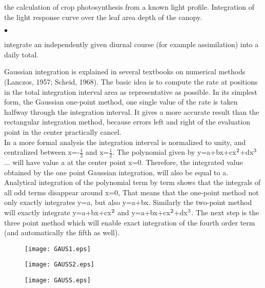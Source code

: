 \documentclass[11pt]{article}
\begin{document}
\begin{indenting}{1.27cm}
the calculation of crop photosynthesis from a known light profile. Integration
of the light response curve over the leaf area depth of the canopy. 
\end{indenting}
$\bullet$ 
\testlastline

\begin{indenting}{1.27cm}
integrate an independently given diurnal course (for example assimilation) into
a daily total.
\end{indenting}

 \bigskip
Gaussian integration is explained in several textbooks on numerical methods (Lanczos, 1957;
Scheid, 1968). The basic idea is to compute the rate at positions in the total integration
interval area as representative as possible. In its simplest form, the Gaussian one-point
method, one single value of the rate is taken halfway through the integration interval. It
gives a more accurate result than the rectangular integration method, because errors left and
right of the evaluation point in the center practically cancel.\\
In a more formal analysis the integration interval is normalized to unity, and centralized
between x=-$\frac{1}{2}$ and x=$\frac{1}{2}$. The polynomial given by y=a+bx+cx$^{{\rm 2}}$+dx$^{{\rm 3}}$ ... will have value
a at the center point x=0. Therefore, the integrated value obtained by the one point
Gaussian integration, will also be equal to a. Analytical integration of the polynomial term
by term shows that the integrals of all odd terms disappear around x=0, That means that
the one-point method not only exactly integrates y=a, but also y=a+bx. Similarly the two-point method will exactly integrate y=a+bx+cx$^{{\rm 2}}$ and y=a+bx+cx$^{{\rm 2}}$+dx$^{{\rm 3}}$. The next step is
the three point method which will enable exact integration of the fourth order term (and
automatically the fifth as well).
 
\begin{figure}[htbp]
 \begin{center}\texttt{[image: GAUS1.eps]} \end{center}
\end{figure}
\begin{figure}[htbp]
 \begin{center}\texttt{[image: GAUSS2.eps]} \end{center}
\end{figure}
\begin{figure}[htbp]
 \begin{center}\texttt{[image: GAUSS.eps]} \end{center}
\end{figure}
     
\end{document}
